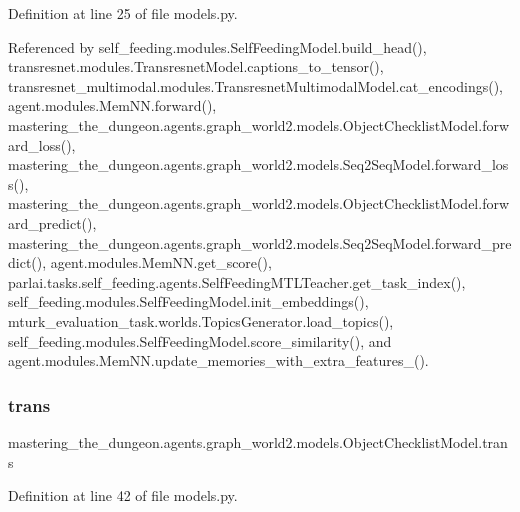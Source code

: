 Definition at line 25 of file models.\+py.



Referenced by self\+\_\+feeding.\+modules.\+Self\+Feeding\+Model.\+build\+\_\+head(), transresnet.\+modules.\+Transresnet\+Model.\+captions\+\_\+to\+\_\+tensor(), transresnet\+\_\+multimodal.\+modules.\+Transresnet\+Multimodal\+Model.\+cat\+\_\+encodings(), agent.\+modules.\+Mem\+N\+N.\+forward(), mastering\+\_\+the\+\_\+dungeon.\+agents.\+graph\+\_\+world2.\+models.\+Object\+Checklist\+Model.\+forward\+\_\+loss(), mastering\+\_\+the\+\_\+dungeon.\+agents.\+graph\+\_\+world2.\+models.\+Seq2\+Seq\+Model.\+forward\+\_\+loss(), mastering\+\_\+the\+\_\+dungeon.\+agents.\+graph\+\_\+world2.\+models.\+Object\+Checklist\+Model.\+forward\+\_\+predict(), mastering\+\_\+the\+\_\+dungeon.\+agents.\+graph\+\_\+world2.\+models.\+Seq2\+Seq\+Model.\+forward\+\_\+predict(), agent.\+modules.\+Mem\+N\+N.\+get\+\_\+score(), parlai.\+tasks.\+self\+\_\+feeding.\+agents.\+Self\+Feeding\+M\+T\+L\+Teacher.\+get\+\_\+task\+\_\+index(), self\+\_\+feeding.\+modules.\+Self\+Feeding\+Model.\+init\+\_\+embeddings(), mturk\+\_\+evaluation\+\_\+task.\+worlds.\+Topics\+Generator.\+load\+\_\+topics(), self\+\_\+feeding.\+modules.\+Self\+Feeding\+Model.\+score\+\_\+similarity(), and agent.\+modules.\+Mem\+N\+N.\+update\+\_\+memories\+\_\+with\+\_\+extra\+\_\+features\+\_\+().

\mbox{\label{classmastering__the__dungeon_1_1agents_1_1graph__world2_1_1models_1_1ObjectChecklistModel_a8322505c97d6bff2df39ef10381e7db0}} 
\subsubsection{\texorpdfstring{trans}{trans}}
{\footnotesize\ttfamily mastering\+\_\+the\+\_\+dungeon.\+agents.\+graph\+\_\+world2.\+models.\+Object\+Checklist\+Model.\+trans}



Definition at line 42 of file models.\+py.



